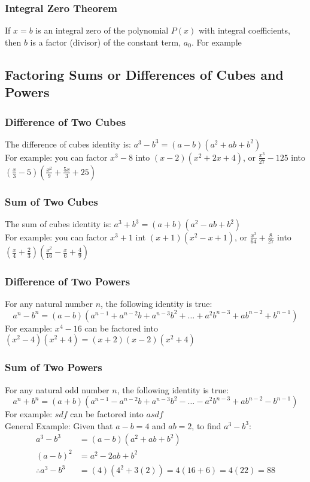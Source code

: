 \documentclass{article}
\begin{document}
	\subsubsection{Integral Zero Theorem}
	If $x=b$ is an integral zero of the polynomial $P(x)$ with integral coefficients, then $b$ is a factor (divisor) of the constant term, $a_0$.
	For example
	\subsection{Factoring Sums or Differences of Cubes and Powers}
	\subsubsection{Difference of Two Cubes}
	The difference of cubes identity is: $a^3-b^3=(a-b)(a^2+ab+b^2)$\\
	For example: you can factor $x^3-8$ into $(x-2)(x^2+2x+4)$, or $\frac{x^3}{27}-125$ into $(\frac{x}{3}-5)(\frac{x^2}{9}+\frac{5x}{3}+25)$
	\subsubsection{Sum of Two Cubes}
	The sum of cubes identity is: $a^3+b^3=(a+b)(a^2-ab+b^2)$\\
	For example: you can factor $x^3+1$ int $(x+1)(x^2-x+1)$, or $\frac{x^3}{64}+\frac{8}{27}$ into $(\frac{x}{4}+\frac{2}{3})(\frac{x^2}{16}-\frac{x}{6}+\frac{4}{9})$
	\subsubsection{Difference of Two Powers}
	For any natural number $n$, the following identity is true: \[a^n-b^n=(a-b)(a^{n-1}+a^{n-2}b+a^{n-3}b^2+\dots+a^2b^{n-3}+ab^{n-2}+b^{n-1})\]
	For example: $x^4-16$ can be factored into $(x^2-4)(x^2+4)=(x+2)(x-2)(x^2+4)$
	\subsubsection{Sum of Two Powers}
	For any natural odd number $n$, the following identity is true: \[a^n+b^n=(a+b)(a^{n-1}-a^{n-2}b+a^{n-3}b^2-\dots-a^2b^{n-3}+ab^{n-2}-b^{n-1})\]
	For example: $sdf$ can be factored into $asdf$\\
	General Example: Given that $a-b=4$ and $ab=2$, to find $a^3-b^3$:\\
	\begin{align*}
		a^3-b^3&=(a-b)(a^2+ab+b^2)\\
		(a-b)^2&=a^2-2ab+b^2\\
		\therefore a^3-b^3&=(4)(4^2+3(2))=4(16+6)=4(22)=88
	\end{align*}
	\setcounter{section}{4}
	\setcounter{subsection}{1}
\end{document}
